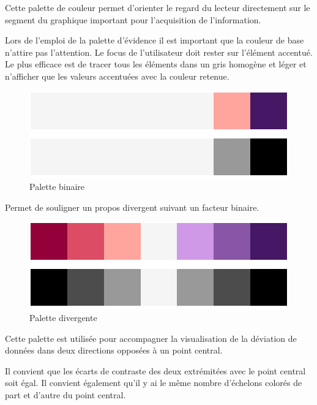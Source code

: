 \documentclass[a4paper,12pt]{article}
\begin{document}
\begin{multicols}{2}
Cette palette de couleur permet d'orienter le regard du lecteur directement sur le segment du graphique important pour l'acquisition de l'information.\autocite{andreaskrauseBestPracticesData2024}

Lors de l'emploi de la palette d'évidence il est important que la couleur de base n'attire pas l'attention. Le focus de l'utilisateur doit rester sur l'élément accentué.\autocite{wilkeColorScales2019}
Le plus efficace est de tracer tous les éléments dans un gris homogène et léger et n'afficher que les valeurs accentuées avec la couleur retenue. \autocite{wilkeColorScales2019}

\begin{figure}[H]
\centering
\includegraphics[width=.9\linewidth]{./img/palette-binaire.pdf}
\caption{\label{fig:Pal-b}Palette binaire}
\end{figure}

Permet de souligner un propos divergent suivant un facteur binaire.\autocite{jonathanschwabishDevelopingDataVisualization2021} 

\begin{figure}[H]
\centering
\includegraphics[width=.9\linewidth]{./img/palette-divergente.pdf}
\caption{\label{fig:Pal-d}Palette divergente}
\end{figure}

Cette palette est utilisée pour accompagner la visualisation de la déviation de données dans deux directions opposées à un point central. \autocite{wilkeColorScales2019}

Il convient que les écarts de contraste des deux extrémitées avec le point central soit égal. Il convient également qu'il y ai le même nombre d'échelons colorés de part et d'autre du point central. \autocite{wilkeColorScales2019}


\end{multicols}
\end{document}
